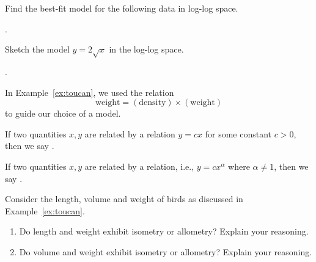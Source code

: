 \documentclass[../main.tex]{subfiles}
\begin{document}
\begin{example}
  Find the best-fit model for the following data in log-log space.

  .
\end{example}

\begin{example}
  Sketch the model \(y = 2 \sqrt{x}\) in the log-log space.
  
  .
\end{example}

\clearpage
In Example~\ref{ex:toucan}, we used the relation \[\text{weight} = (\text{density}) \times (\text{weight}) \] to guide our choice of a model. 

\begin{mdframed}[style=simple]
  If two quantities \(x,y\) are related by a  relation \(y = c x\) for some constant \(c > 0\), then we say .

  If two quantities \(x,y\) are related by a  relation, i.e., \(y = c x^{\alpha}\) where \(\alpha \ne 1\), then we say .
\end{mdframed}

\begin{example}
  Consider the length, volume and weight of birds as discussed in Example~\ref{ex:toucan}.

  \begin{enumerate}[wide]
    \item Do length and weight exhibit isometry or allometry? Explain your reasoning.

    \item Do volume and weight exhibit isometry or allometry? Explain your reasoning.
  \end{enumerate}
\end{example}
\end{document}
